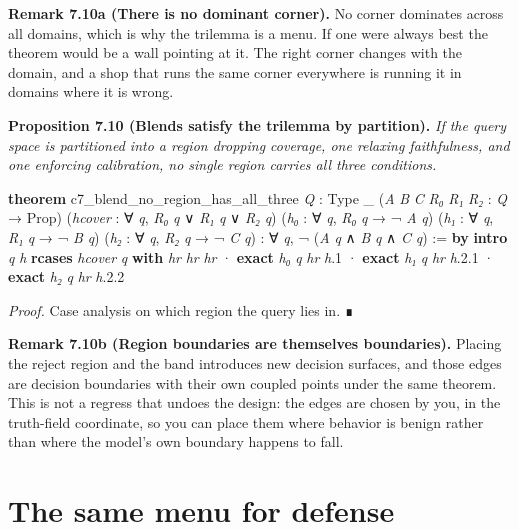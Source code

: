\documentclass{memoir}
\begin{document}
\textbf{Remark 7.10a (There is no dominant corner).} No corner dominates across all domains,
which is why the trilemma is a menu. If one were always best the theorem would
be a wall pointing at it. The right corner changes with the domain, and a shop
that runs the same corner everywhere is running it in domains where it is wrong.

\textbf{Proposition 7.10 (Blends satisfy the trilemma by partition).} \emph{If the query space is
partitioned into a region dropping coverage, one relaxing faithfulness, and one
enforcing calibration, no single region carries all three conditions.}

\begin{LeanVerbatim}
\textbf{theorem} c7_blend_no_region_has_all_three \textit{Q} : Type _
    (\textit{A} \textit{B} \textit{C} \textit{R₀} \textit{R₁} \textit{R₂} : \textit{Q} → Prop)
    (\textit{hcover} : ∀ \textit{q}, \textit{R₀} \textit{q} ∨ \textit{R₁} \textit{q} ∨ \textit{R₂} \textit{q})
    (\textit{h₀} : ∀ \textit{q}, \textit{R₀} \textit{q} → ¬ \textit{A} \textit{q})
    (\textit{h₁} : ∀ \textit{q}, \textit{R₁} \textit{q} → ¬ \textit{B} \textit{q})
    (\textit{h₂} : ∀ \textit{q}, \textit{R₂} \textit{q} → ¬ \textit{C} \textit{q}) :
    ∀ \textit{q}, ¬ (\textit{A} \textit{q} ∧ \textit{B} \textit{q} ∧ \textit{C} \textit{q}) := \textbf{by}
  \textbf{intro} \textit{q} \textit{h}
  \textbf{rcases} \textit{hcover} \textit{q} \textbf{with} \textit{hr}  \textit{hr}  \textit{hr}
  · \textbf{exact} \textit{h₀} \textit{q} \textit{hr} \textit{h}.1
  · \textbf{exact} \textit{h₁} \textit{q} \textit{hr} \textit{h}.2.1
  · \textbf{exact} \textit{h₂} \textit{q} \textit{hr} \textit{h}.2.2

\end{LeanVerbatim}


\emph{Proof.} Case analysis on which region the query lies in. ∎

\textbf{Remark 7.10b (Region boundaries are themselves boundaries).} Placing the reject
region and the band introduces new decision surfaces, and those edges are
decision boundaries with their own coupled points under the same theorem. This
is not a regress that undoes the design: the edges are chosen by you, in the
truth-field coordinate, so you can place them where behavior is benign rather
than where the model's own boundary happens to fall.



\section{The same menu for defense}\label{Two--Schemas--of--Impossibility-005F-005F-005F--Machine--Checked--Limits--of--Trustworthy--Machine--Learning-005F-005F-005F--and--Why--They--Tighten--with--Capability----What--It--Means--for--AI--Safety----The--same--menu--for--defense}
\end{document}
